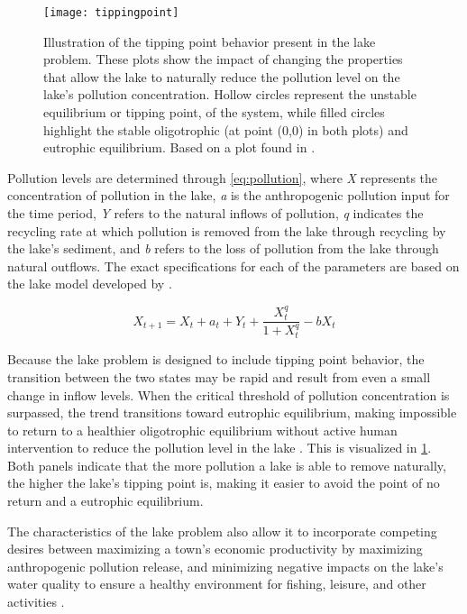     \begin{figure}[ht]
        \centering
        
        \texttt{[image: tippingpoint]}
        \caption[Tipping point behavior integrated into the shallow lake problem.]{Illustration of the tipping point behavior present in the lake problem. These plots show the impact of changing the properties that allow the lake to naturally reduce the pollution level on the lake's pollution concentration. Hollow circles represent the unstable equilibrium or tipping point, of the system, while filled circles highlight the stable oligotrophic (at point (0,0) in both plots) and eutrophic equilibrium. Based on a plot found in \citet{Quinn2017}.}
        \label{fig:tippingpoint}
    \end{figure}
    
    Pollution levels are determined through \cref{eq:pollution}, where \textit{X} represents the concentration of pollution in the lake, \textit{a} is the anthropogenic pollution input for the time period, \textit{Y} refers to the natural inflows of pollution, \textit{q} indicates the recycling rate at which pollution is removed from the lake through recycling by the lake's sediment, and \textit{b} refers to the loss of pollution from the lake through natural outflows. The exact specifications for each of the parameters are based on the lake model developed by \citet{Quinn2017}. 

    \begin{equation}\label{eq:pollution}
        X_{t+1} = X_{t} + a_{t} + Y_{t} + \frac{X_{t}^{q}}{1+X_{t}^{q}} - bX_{t}
    \end{equation}

    Because the lake problem is designed to include tipping point behavior, the transition between the two states may be rapid and result from even a small change in inflow levels. When the critical threshold of pollution concentration is surpassed, the trend transitions toward eutrophic equilibrium, making impossible to return to a healthier oligotrophic equilibrium without active human intervention to reduce the pollution level in the lake \citep{Quinn2017}. This is visualized in \cref{fig:tippingpoint}. Both panels indicate that the more pollution a lake is able to remove naturally, the higher the lake's tipping point is, making it easier to avoid the point of no return and a eutrophic equilibrium. 
    
    The characteristics of the lake problem also allow it to incorporate competing desires between maximizing a town's economic productivity by maximizing anthropogenic pollution release, and minimizing negative impacts on the lake's water quality to ensure a healthy environment for fishing, leisure, and other activities \citep{Ward2015}. 
    

